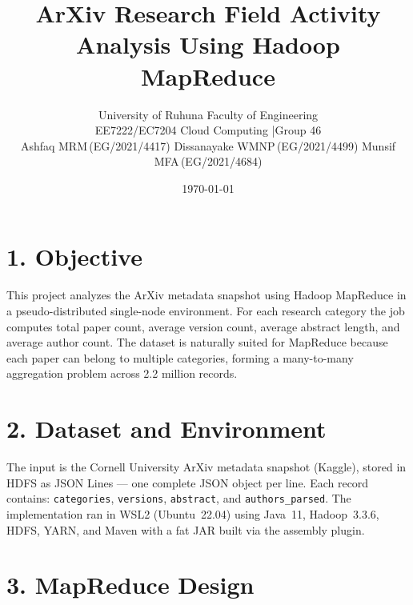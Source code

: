 \documentclass[11pt,a4paper]{article}
\title{\vspace{-8pt}\textbf{ArXiv Research Field Activity Analysis Using Hadoop MapReduce}\vspace{-4pt}}
\author{%
  \normalsize University of Ruhuna \textemdash{} Faculty of Engineering\\[1pt]
  \normalsize EE7222/EC7204 Cloud Computing \quad|\quad Group 46\\[3pt]
  \small Ashfaq MRM\,(EG/2021/4417) \quad
         Dissanayake WMNP\,(EG/2021/4499) \quad
         Munsif MFA\,(EG/2021/4684)%
}
\date{\today}
\begin{document}
\maketitle
\vspace{-12pt}

\section*{1. Objective}
This project analyzes the ArXiv metadata snapshot using Hadoop MapReduce in a pseudo-distributed single-node environment. For each research category the job computes total paper count, average version count, average abstract length, and average author count. The dataset is naturally suited for MapReduce because each paper can belong to multiple categories, forming a many-to-many aggregation problem across 2.2 million records.

\section*{2. Dataset and Environment}
The input is the Cornell University ArXiv metadata snapshot (Kaggle), stored in HDFS as JSON Lines — one complete JSON object per line. Each record contains: \texttt{categories}, \texttt{versions}, \texttt{abstract}, and \texttt{authors\_parsed}. The implementation ran in WSL2 (Ubuntu~22.04) using Java~11, Hadoop~3.3.6, HDFS, YARN, and Maven with a fat JAR built via the assembly plugin.

\section*{3. MapReduce Design}
\end{document}
